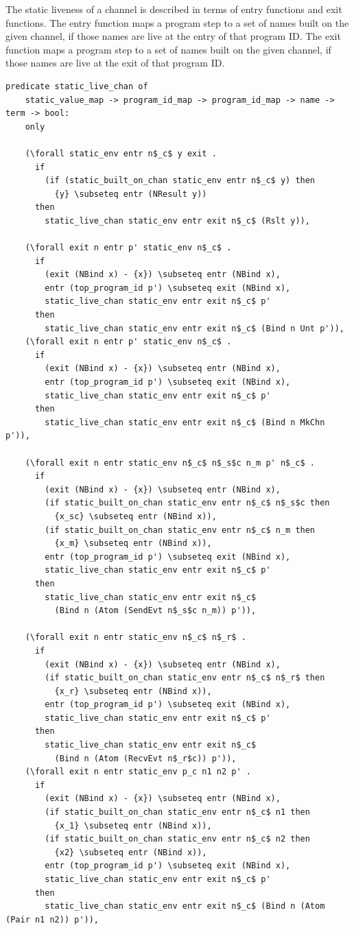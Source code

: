 \documentclass[10pt]{article}
\begin{document}
The static liveness of a channel is described in terms of entry functions and
exit functions. The entry function maps a program step to a set of names built on
the given channel, if those names are live at the entry of that program ID.
The exit function maps a program step to a
set of names built on the given channel, if those names are live at the exit of that
program ID.

\begin{lstlisting}[language=logic, mathescape]
  predicate static_live_chan of
    static_value_map -> program_id_map -> program_id_map -> name -> term -> bool:
    only

    (\forall static_env entr n$_c$ y exit .
      if
        (if (static_built_on_chan static_env entr n$_c$ y) then
          {y} \subseteq entr (NResult y))
      then
        static_live_chan static_env entr exit n$_c$ (Rslt y)),

    (\forall exit n entr p' static_env n$_c$ .
      if 
        (exit (NBind x) - {x}) \subseteq entr (NBind x),
        entr (top_program_id p') \subseteq exit (NBind x),
        static_live_chan static_env entr exit n$_c$ p'
      then 
        static_live_chan static_env entr exit n$_c$ (Bind n Unt p')),
    (\forall exit n entr p' static_env n$_c$ .
      if
        (exit (NBind x) - {x}) \subseteq entr (NBind x),
        entr (top_program_id p') \subseteq exit (NBind x),
        static_live_chan static_env entr exit n$_c$ p'
      then 
        static_live_chan static_env entr exit n$_c$ (Bind n MkChn p')),

    (\forall exit n entr static_env n$_c$ n$_s$c n_m p' n$_c$ .
      if
        (exit (NBind x) - {x}) \subseteq entr (NBind x),
        (if static_built_on_chan static_env entr n$_c$ n$_s$c then
          {x_sc} \subseteq entr (NBind x)),
        (if static_built_on_chan static_env entr n$_c$ n_m then 
          {x_m} \subseteq entr (NBind x)),
        entr (top_program_id p') \subseteq exit (NBind x),
        static_live_chan static_env entr exit n$_c$ p'
      then
        static_live_chan static_env entr exit n$_c$
          (Bind n (Atom (SendEvt n$_s$c n_m)) p')),

    (\forall exit n entr static_env n$_c$ n$_r$ .    
      if
        (exit (NBind x) - {x}) \subseteq entr (NBind x),
        (if static_built_on_chan static_env entr n$_c$ n$_r$ then
          {x_r} \subseteq entr (NBind x)),
        entr (top_program_id p') \subseteq exit (NBind x),
        static_live_chan static_env entr exit n$_c$ p'
      then
        static_live_chan static_env entr exit n$_c$
          (Bind n (Atom (RecvEvt n$_r$c)) p')),
    (\forall exit n entr static_env p_c n1 n2 p' .
      if
        (exit (NBind x) - {x}) \subseteq entr (NBind x),
        (if static_built_on_chan static_env entr n$_c$ n1 then
          {x_1} \subseteq entr (NBind x)),
        (if static_built_on_chan static_env entr n$_c$ n2 then
          {x2} \subseteq entr (NBind x)),
        entr (top_program_id p') \subseteq exit (NBind x),
        static_live_chan static_env entr exit n$_c$ p'
      then
        static_live_chan static_env entr exit n$_c$ (Bind n (Atom (Pair n1 n2)) p')),


\end{lstlisting}
\end{document}
